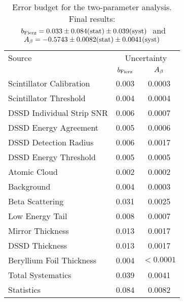 



\begin{table}[h!!!!t]
	\begin{center}
	\begin{tabular}{ l  c  c  }
		\multicolumn{1}{l}{ Source} 		& \multicolumn{2}{c}{ \;\;\; \;\;\; Uncertainty \;\;\; \;\;\; }   
		\\
		\multicolumn{1}{l}{ } 				& \multicolumn{1}{c}{\;\; $b_{\mathrm{Fierz}}$}   & \multicolumn{1}{c}{$A_{\beta}$}   	
		\\  \hline
		Scintillator Calibration 			& 0.003								& 0.0003											
		\\
		Scintillator Threshold  			& 0.004 							& 0.0004 						
		\\
		DSSD Individual Strip SNR 			& 0.006								& 0.0007													
		\\
		DSSD Energy Agreement	  			& 0.005 							& 0.0006 						
		\\
		DSSD Detection Radius	  			& 0.006 							& 0.0017 						
		\\
		DSSD Energy Threshold	  			& 0.005 							& 0.0005 						
		\\
		Atomic Cloud			  			& 0.002 							& 0.0002 						
		\\
		Background				  			& 0.004 							& 0.0003 						
		\\
		Beta Scattering				  		& 0.031 							& 0.0025 						
		\\
		Low Energy Tail				  		& 0.008 							& 0.0007 						
		\\
		Mirror Thickness				  	& 0.013 							& 0.0017 						
		\\
		DSSD Thickness				 	 	& 0.013 							& 0.0017 						
		\\
		Beryllium Foil Thickness			& 0.004								& $\!\!\!\!\!\! < 0.0001$ 			
		\\  \hline
		\multicolumn{1}{l}{ Total Systematics} & \multicolumn{1}{c}{0.039}  & \multicolumn{1}{c}{0.0041}
		\\
		\multicolumn{1}{l}{ Statistics} 	   & \multicolumn{1}{c}{0.084}  & \multicolumn{1}{c}{0.0082}
	\end{tabular}
	\end{center}
	\caption[Error Budget]{Error budget for the two-parameter analysis.  Final results: 
	$\mbox{ $b_{\mathrm{Fierz}} = 0.033 \pm 0.084(\textrm{stat}) \pm 0.039(\textrm{syst})$ }$ and $\mbox{ $A_{\beta} = -0.5743 \pm 0.0082(\textrm{stat}) \pm 0.0041(\textrm{syst})$ }$ }
	\label{table:budget}
\end{table}




